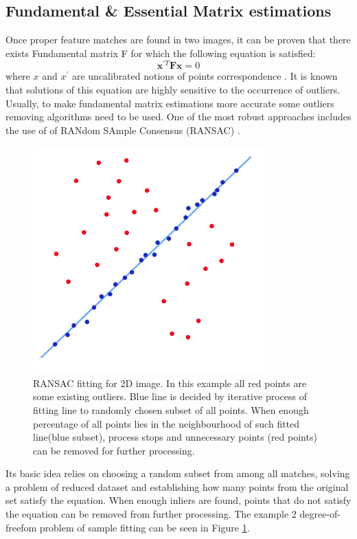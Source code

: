 \subsection{Fundamental \& Essential Matrix estimations}
Once proper feature matches are found in two images, it can be proven that there exists Fundamental matrix F for which the following equation is satisfied:
\begin{equation} \label{eq:fundamntalEquation}
\textbf{x}^{'T} \textbf{F} \textbf{x} = 0
\end{equation} 
where $x$ and ${x}^{'}$ are uncalibrated notions of points correspondence \cite{HartleyMultipleView}. It is known that solutions of this equation are highly sensitive to the occurrence of outliers. Usually, to make fundamental matrix estimations more accurate some outliers removing algorithms need to be used. One of the most robust approaches includes the use of of RANdom SAmple Consensus (RANSAC) \cite{website:ransac}.
\begin{figure}[h!]
    \centering
    \includegraphics[width=0.8\textwidth]{RANSACFitting}
    \caption[RANSAC fitting for 2D image]{RANSAC fitting for 2D image\cite{website:ransac}. In this example all red points are some existing outliers. Blue line is decided by iterative process of fitting line to randomly chosen subset of all points. When enough percentage of all points lies in the neighbourhood of such fitted line(blue subset), process stops and unnecessary points (red points) can be removed for further processing.}
    \label{fig:RANSACFitting}
\end{figure}
Its basic idea relies on choosing a random subset from among all matches, solving a problem of reduced dataset and establishing how many points from the original set satisfy the equation. When enough inliers are found, points that do not satisfy the equation can be removed from further processing. The example 2 degree-of-freefom problem of sample fitting can be seen in Figure \ref{fig:RANSACFitting}. \\


